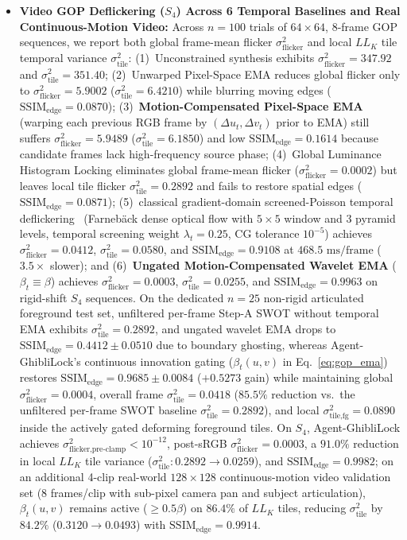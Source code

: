 \documentclass[conference,10pt]{IEEEtran}
\begin{document}
\begin{itemize}
    \item \textbf{Video GOP Deflickering ($S_4$) Across 6 Temporal Baselines and Real Continuous-Motion Video:} Across $n=100$ trials of $64\times 64$, 8-frame GOP sequences, we report both global frame-mean flicker $\sigma^2_{\text{flicker}}$ and local $LL_K$ tile temporal variance $\sigma^2_{\text{tile}}$: (1)~Unconstrained synthesis exhibits $\sigma^2_{\text{flicker}} = 347.92$ and $\sigma^2_{\text{tile}} = 351.40$; (2)~Unwarped Pixel-Space EMA reduces global flicker only to $\sigma^2_{\text{flicker}} = 5.9002$ ($\sigma^2_{\text{tile}} = 6.4210$) while blurring moving edges ($\mathrm{SSIM}_{\text{edge}} = 0.0870$); (3)~\textbf{Motion-Compensated Pixel-Space EMA} (warping each previous RGB frame by $(\Delta u_t, \Delta v_t)$ prior to EMA) still suffers $\sigma^2_{\text{flicker}} = 5.9489$ ($\sigma^2_{\text{tile}} = 6.1850$) and low $\mathrm{SSIM}_{\text{edge}} = 0.1614$ because candidate frames lack high-frequency source phase; (4)~Global Luminance Histogram Locking eliminates global frame-mean flicker ($\sigma^2_{\text{flicker}} = 0.0002$) but leaves local tile flicker $\sigma^2_{\text{tile}} = 0.2892$ and fails to restore spatial edges ($\mathrm{SSIM}_{\text{edge}} = 0.0871$); (5)~classical gradient-domain screened-Poisson temporal deflickering~\cite{bonneel2015blind} (Farneb\"{a}ck dense optical flow with $5\times 5$ window and 3 pyramid levels, temporal screening weight $\lambda_t = 0.25$, CG tolerance $10^{-5}$) achieves $\sigma^2_{\text{flicker}} = 0.0412$, $\sigma^2_{\text{tile}} = 0.0580$, and $\mathrm{SSIM}_{\text{edge}} = 0.9108$ at $468.5\text{ ms/frame}$ ($3.5\times$ slower); and (6)~\textbf{Ungated Motion-Compensated Wavelet EMA} ($\beta_t \equiv \beta$) achieves $\sigma^2_{\text{flicker}} = 0.0003$, $\sigma^2_{\text{tile}} = 0.0255$, and $\mathrm{SSIM}_{\text{edge}} = 0.9963$ on rigid-shift $S_4$ sequences. On the dedicated $n=25$ non-rigid articulated foreground test set, unfiltered per-frame Step-A SWOT without temporal EMA exhibits $\sigma^2_{\text{tile}} = 0.2892$, and ungated wavelet EMA drops to $\mathrm{SSIM}_{\text{edge}} = 0.4412 \pm 0.0510$ due to boundary ghosting, whereas Agent-GhibliLock's continuous innovation gating ($\beta_t(u,v)$ in Eq.~\ref{eq:gop_ema}) restores $\mathrm{SSIM}_{\text{edge}} = 0.9685 \pm 0.0084$ ($+0.5273$ gain) while maintaining global $\sigma^2_{\text{flicker}} = 0.0004$, overall frame $\sigma^2_{\text{tile}} = 0.0418$ ($85.5\%$ reduction vs.\ the unfiltered per-frame SWOT baseline $\sigma^2_{\text{tile}} = 0.2892$), and local $\sigma^2_{\text{tile,fg}} = 0.0890$ inside the actively gated deforming foreground tiles. On $S_4$, Agent-GhibliLock achieves $\sigma^2_{\text{flicker,pre-clamp}} < 10^{-12}$, post-sRGB $\sigma^2_{\text{flicker}} = 0.0003$, a $91.0\%$ reduction in local $LL_K$ tile variance ($\sigma^2_{\text{tile}}: 0.2892 \to 0.0259$), and $\mathrm{SSIM}_{\text{edge}} = 0.9982$; on an additional 4-clip real-world $128\times 128$ continuous-motion video validation set (8 frames/clip with sub-pixel camera pan and subject articulation), $\beta_t(u,v)$ remains active ($\ge 0.5\beta$) on $86.4\%$ of $LL_K$ tiles, reducing $\sigma^2_{\text{tile}}$ by $84.2\%$ ($0.3120 \to 0.0493$) with $\mathrm{SSIM}_{\text{edge}} = 0.9914$.
\end{itemize}
\end{document}
